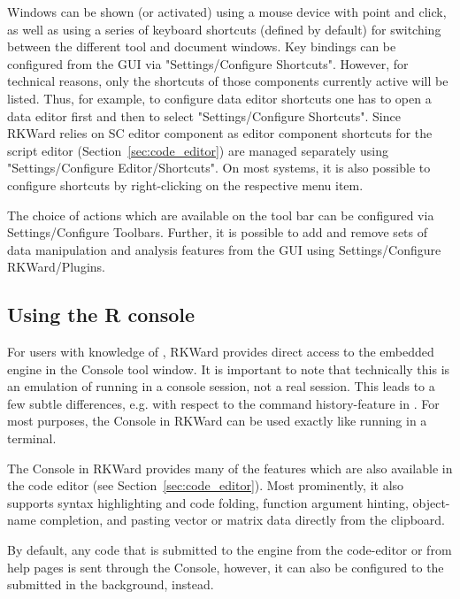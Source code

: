 Windows can be shown (or activated) using a mouse device with point and
click, as well as using a series of keyboard shortcuts (defined by
default) for switching between the different tool and document windows.
Key bindings can be configured from the GUI via "Settings/Configure
Shortcuts". However, for technical reasons, only the shortcuts of those
components currently active will be listed. Thus, for example, to
configure data editor shortcuts one has to open a data editor first and
then to select "Settings/Configure Shortcuts". Since RKWard relies on
 SC editor component as editor component
shortcuts for the script editor (Section~\ref{sec:code_editor}) are managed separately using
"Settings/Configure Editor/Shortcuts". On most systems, it is also
possible to configure shortcuts by right-clicking on the respective
menu item.

The choice of actions which are available on the tool bar can be
configured via Settings/Configure Toolbars. Further, it is possible to add and remove sets
of data manipulation and analysis features from the GUI using
Settings/Configure RKWard/Plugins.

\subsection{Using the R console}
\label{sec:using_R_console}
For users with knowledge of , RKWard provides direct access to the
embedded  engine in the
 Console tool window. It is important to note that technically this is an
emulation of  running in a console
session, not a real  session. This leads to a few subtle
differences, e.g. with respect to the command history-feature in
. For most purposes, the  Console in RKWard can be used exactly
like  running in a terminal.

The  Console in RKWard provides many of the
features which are also available in the code editor (see Section~\ref{sec:code_editor}).
Most prominently, it also supports syntax highlighting and code
folding, function argument hinting, object-name completion, and pasting
vector or matrix data directly from the clipboard.

By default, any code that is submitted to the
 engine from the code-editor or from help
pages is sent through the  Console,
however, it can also be configured to the submitted in the background,
instead.

